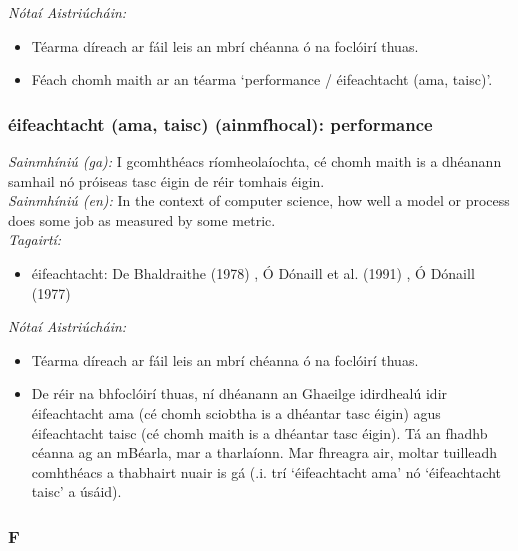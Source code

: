  \noindent \textit{Nótaí Aistriúcháin:}
\begin{itemize}
	\item Téarma díreach ar fáil leis an mbrí chéanna ó na foclóirí thuas.
	\item Féach chomh maith ar an téarma `performance / éifeachtacht (ama, taisc)'.
\end{itemize}


\subsubsection*{éifeachtacht (ama, taisc) (ainmfhocal): performance}
 \noindent \textit{Sainmhíniú (ga):} I gcomhthéacs ríomheolaíochta, cé chomh maith is a dhéanann samhail nó próiseas tasc éigin de réir tomhais éigin.
\\
 \noindent \textit{Sainmhíniú (en):} In the context of computer science, how well a model or process does some job as measured by some metric.
\\
 \noindent \textit{Tagairtí:}
\begin{itemize}
	\item éifeachtacht: De Bhaldraithe (1978) \cite{de-bhaldraithe}, Ó Dónaill et al. (1991) \cite{focloir-beag}, Ó Dónaill (1977) \cite{odonaill}
\end{itemize}

 \noindent \textit{Nótaí Aistriúcháin:}
\begin{itemize}
	\item Téarma díreach ar fáil leis an mbrí chéanna ó na foclóirí thuas.
	\item De réir na bhfoclóirí thuas, ní dhéanann an Ghaeilge idirdhealú idir éifeachtacht ama (cé chomh sciobtha is a dhéantar tasc éigin) agus éifeachtacht taisc (cé chomh maith is a dhéantar tasc éigin). Tá an fhadhb céanna ag an mBéarla, mar a tharlaíonn. Mar fhreagra air, moltar tuilleadh comhthéacs a thabhairt nuair is gá (.i. trí `éifeachtacht ama' nó `éifeachtacht taisc' a úsáid).
\end{itemize}


 \subsubsection*{F}

